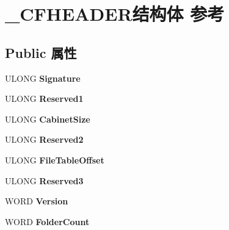 \hypertarget{struct___c_f_h_e_a_d_e_r}{}\section{\+\_\+\+C\+F\+H\+E\+A\+D\+E\+R结构体 参考}
\label{struct___c_f_h_e_a_d_e_r}
\subsection*{Public 属性}
\begin{DoxyCompactItemize}
\item 
\mbox{\label{struct___c_f_h_e_a_d_e_r_ae66063d38cab82f893523c5773605bb9}} 
U\+L\+O\+NG {\bfseries Signature}
\item 
\mbox{\label{struct___c_f_h_e_a_d_e_r_a3797ba2bb56f629b5ac18a1e32254fc4}} 
U\+L\+O\+NG {\bfseries Reserved1}
\item 
\mbox{\label{struct___c_f_h_e_a_d_e_r_a7d8d8d3002e39d5cac7f1659ac346753}} 
U\+L\+O\+NG {\bfseries Cabinet\+Size}
\item 
\mbox{\label{struct___c_f_h_e_a_d_e_r_ae9633453dc0f4c4d0beb6696446d63d6}} 
U\+L\+O\+NG {\bfseries Reserved2}
\item 
\mbox{\label{struct___c_f_h_e_a_d_e_r_a843cf513b0065f98ec4697a0f73f3e23}} 
U\+L\+O\+NG {\bfseries File\+Table\+Offset}
\item 
\mbox{\label{struct___c_f_h_e_a_d_e_r_a2e6c905f83a8603916f912c7abb14584}} 
U\+L\+O\+NG {\bfseries Reserved3}
\item 
\mbox{\label{struct___c_f_h_e_a_d_e_r_a057e7513af3c48923a79c3608357520a}} 
W\+O\+RD {\bfseries Version}
\item 
\mbox{\label{struct___c_f_h_e_a_d_e_r_ad4f5412ce405722eb80f696e9a959a60}} 
W\+O\+RD {\bfseries Folder\+Count}
\item 
\mbox{\label{struct___c_f_h_e_a_d_e_r_a8d41acc729c18e206b9fc5a6004f0d01}} 

\end{DoxyCompactItemize}
